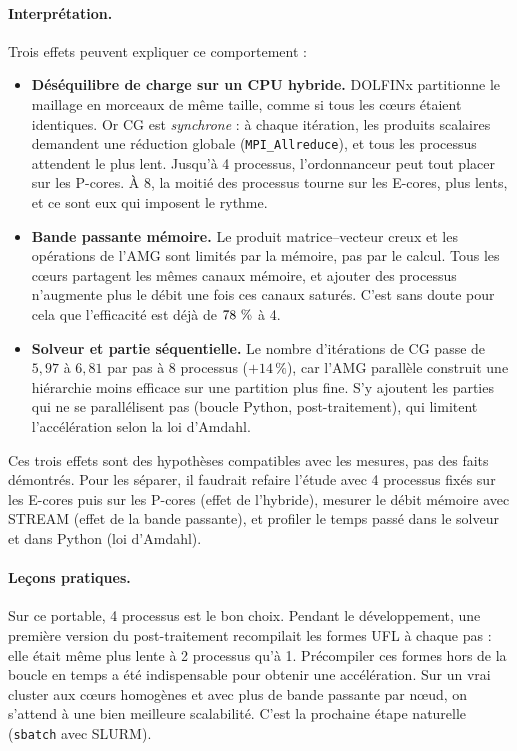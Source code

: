 \documentclass[11pt,a4paper]{article}
\begin{document}
\paragraph{Interprétation.} Trois effets peuvent expliquer ce comportement :
\begin{itemize}
  \item \textbf{Déséquilibre de charge sur un CPU hybride.} DOLFINx partitionne le maillage en
        morceaux de même taille, comme si tous les cœurs étaient identiques. Or CG est
        \emph{synchrone} : à chaque itération, les produits scalaires demandent une réduction
        globale (\texttt{MPI\_Allreduce}), et tous les processus attendent le plus lent. Jusqu'à 4
        processus, l'ordonnanceur peut tout placer sur les P-cores. À 8, la moitié des processus
        tourne sur les E-cores, plus lents, et ce sont eux qui imposent le rythme.
  \item \textbf{Bande passante mémoire.} Le produit matrice--vecteur creux et les opérations de
        l'AMG sont limités par la mémoire, pas par le calcul. Tous les cœurs partagent les mêmes
        canaux mémoire, et ajouter des processus n'augmente plus le débit une fois ces canaux
        saturés. C'est sans doute pour cela que l'efficacité est déjà de $\num{78}~\%$ à 4.
  \item \textbf{Solveur et partie séquentielle.} Le nombre d'itérations de CG passe de $5{,}97$ à
        $6{,}81$ par pas à 8 processus ($+14\,\%$), car l'AMG parallèle construit une hiérarchie
        moins efficace sur une partition plus fine. S'y ajoutent les parties qui ne se parallélisent
        pas (boucle Python, post-traitement), qui limitent l'accélération selon la loi d'Amdahl.
\end{itemize}
Ces trois effets sont des hypothèses compatibles avec les mesures, pas des faits démontrés. Pour les
séparer, il faudrait refaire l'étude avec 4 processus fixés sur les E-cores puis sur les P-cores
(effet de l'hybride), mesurer le débit mémoire avec STREAM (effet de la bande passante), et profiler
le temps passé dans le solveur et dans Python (loi d'Amdahl).

\paragraph{Leçons pratiques.} Sur ce portable, 4 processus est le bon choix. Pendant le développement,
une première version du post-traitement recompilait les formes UFL à chaque pas : elle était même
plus lente à 2 processus qu'à 1. Précompiler ces formes hors de la boucle en temps a été
indispensable pour obtenir une accélération. Sur un vrai cluster aux cœurs homogènes et avec plus de
bande passante par nœud, on s'attend à une bien meilleure scalabilité. C'est la prochaine étape
naturelle (\texttt{sbatch} avec SLURM).
\end{document}
